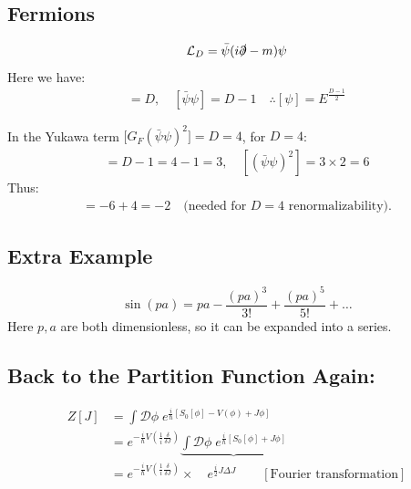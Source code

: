\documentclass[14pt]{article} %
\begin{document}
\subsection*{Fermions}
\begin{align*}
\mathcal{L}_D = \bar{\psi}(i\slashed{\partial} - m)\psi
\end{align*}
Here we have:
\begin{align*}
[\bar{\psi} i\slashed{\partial} \psi] = D, \quad [\bar{\psi} \psi] = D-1 \quad \therefore [\psi] = E^{\frac{D-1}{2}}
\end{align*}

In the Yukawa term $\big[G_F (\bar{\psi}\psi)^2 \big]=D=4$, for $D=4$:
\begin{align*}
[\bar{\psi} \psi] = D-1 = 4-1=3, \quad [(\bar{\psi} \psi)^2] = 3 \times 2 = 6
\end{align*}
Thus:
\begin{align*}
[G_F] = -6+4=-2 \quad \text{(needed for $D=4$ renormalizability)}.
\end{align*}

\subsection*{Extra Example}
$$\sin(pa) = pa - \frac{(p a)^3}{3!} + \frac{(p a)^5}{5!} + \dots$$  
Here $p, a$ are both dimensionless, so it can be expanded into a series.

\subsection*{Back to the Partition Function Again:}
\begin{align*}
Z[J] &= \int \mathcal{D}\phi \; e^{\frac{i}{\hbar} \left[ S_0[\phi] - V(\phi) + J\phi \right]}
\\
&= e^{-\frac{i}{\hbar} V\left( \frac{1}{i} \frac{\delta}{\delta J} \right)}
\underbrace{\int \mathcal{D}\phi \; e^{\frac{i}{\hbar} \left[ S_0[\phi] + J \phi \right]}}
\\
&= e^{-\frac{i}{\hbar} V\left( \frac{1}{i} \frac{\delta}{\delta J} \right)}
\times \quad e^{\frac{i}{2} J \Delta J} \qquad [\text{Fourier transformation}]
\end{align*}
\end{document}
